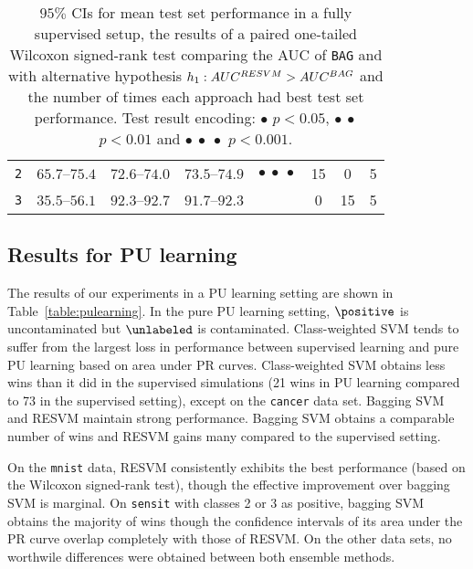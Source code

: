 \begin{table}[!h]
\begin{tabular}{cccccccc}
\texttt{2} & $65.7$--$75.4$ & $72.6$--$74.0$ & $73.5$--$74.9$ & $\bullet\ \bullet\ \bullet$ & 15 & 0 & 5\\ 
\texttt{3} & $35.5$--$56.1$ & $92.3$--$92.7$ & $91.7$--$92.3$ &  & 0 & 15 & 5\\ 
\bottomrule
\end{tabular}
\caption{$95\%$ CIs for mean test set performance in a fully supervised setup, the results of a paired one-tailed Wilcoxon signed-rank test comparing the AUC of \texttt{BAG} and \texttt{\resvm} with alternative hypothesis $h_1: AUC^{RESVM} > AUC^{BAG}$ and the number of times each approach had best test set performance.
Test result encoding: $\bullet$ $p < 0.05$, $\bullet\ \bullet$ $p < 0.01$ and $\bullet\ \bullet\ \bullet$ $p < 0.001$.
}
\label{table:supervised}
\end{table}



\subsection{Results for PU learning}
The results of our experiments in a PU learning setting are shown in Table~\ref{table:pulearning}. In the pure PU learning setting, $\positive$ is uncontaminated but $\unlabeled$ is contaminated. Class-weighted SVM tends to suffer from the largest loss in performance between supervised learning and pure PU learning based on area under PR curves. Class-weighted SVM obtains less wins than it did in the supervised simulations (21 wins in PU learning compared to 73 in the supervised setting), except on the \texttt{cancer} data set. Bagging SVM and RESVM maintain strong performance. Bagging SVM obtains a comparable number of wins and RESVM gains many compared to the supervised setting.

On the \texttt{mnist} data, RESVM consistently exhibits the best performance (based on the Wilcoxon signed-rank test), though the effective improvement over bagging SVM is marginal. On \texttt{sensit} with classes 2 or 3 as positive, bagging SVM obtains the majority of wins though the confidence intervals of its area under the PR curve overlap completely with those of RESVM. On the other data sets, no worthwile differences were obtained between both ensemble methods.


